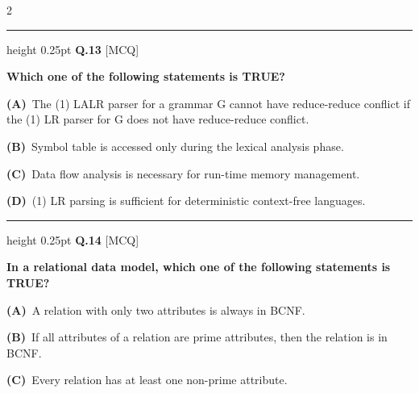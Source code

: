 \documentclass[a4paper,10pt,twoside]{article}
\begin{document}
\begin{multicols}{2}
\par\vspace{6pt}\hrule height 0.25pt\vspace{6pt}
\noindent\textbf{Q.13} \hfill {\footnotesize\textsf{[MCQ]}}
\par\vspace{2pt}
{\bfseries Which one of the following statements is TRUE? \par}
\par\vspace{2pt}\noindent
\textbf{(A)}~The \newline (1) \newline LALR \newline parser for a grammar G cannot have reduce-reduce conflict if the \newline (1) \newline LR \newline parser for G does not have reduce-reduce conflict.\par\vspace{2pt}\noindent
\textbf{(B)}~Symbol table is accessed only during the lexical analysis phase.\par\vspace{2pt}\noindent
\textbf{(C)}~Data flow analysis is necessary for run-time memory management.\par\vspace{2pt}\noindent
\textbf{(D)}~(1) \newline LR \newline parsing is sufficient for deterministic context-free languages.
\par\vspace{6pt}\hrule height 0.25pt\vspace{6pt}
\noindent\textbf{Q.14} \hfill {\footnotesize\textsf{[MCQ]}}
\par\vspace{2pt}
{\bfseries In a relational data model, which one of the following statements is TRUE? \par}
\par\vspace{2pt}\noindent
\textbf{(A)}~A relation with only two attributes is always in BCNF.\par\vspace{2pt}\noindent
\textbf{(B)}~If all attributes of a relation are prime attributes, then the relation is in BCNF.\par\vspace{2pt}\noindent
\textbf{(C)}~Every relation has at least one non-prime attribute.\par\vspace{2pt}\noindent

\end{multicols}
\end{document}
